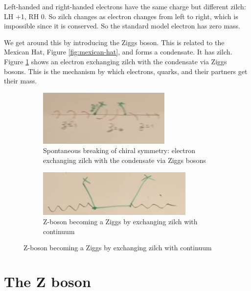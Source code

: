 \documentclass[]{article}
\begin{document}
\begin{figure}[H]
\begin{subfigure}[t]{0.3\textwidth}
	\end{subfigure}	
\end{figure} 

Left-handed and right-handed electrons have the same charge but different zilch: LH +1, RH 0. So zilch changes as electron changes from left to right, which is impossible since it is conserved. So the standard model electron has zero mass.

We get around this by introducing the Ziggs boson. This is related to the Mexican Hat, Figure \ref{fig:mexican-hat}, and forms a condensate. It has zilch. Figure \ref{fig:2-a3-zilch} shows an electron exchanging zilch with the condensate via Ziggs bosons. This is the mechanism by which electrons, quarks, and their partners get their mass.

\begin{figure}[H]
	\caption{Spontaneous breaking of chiral symmetry}
	\begin{subfigure}[t]{0.4\textwidth}
		\caption{Spontaneous breaking of chiral symmetry: electron exchanging zilch with the condensate via Ziggs bosons}\label{fig:2-a3-zilch}
		\includegraphics[width=\textwidth]{2-a3-zilch}
	\end{subfigure}
	\begin{subfigure}[t]{0.4\textwidth}
		\caption{Z-boson becoming a Ziggs by exchanging zilch with continuum}\label{fig:2-a3-zilch-Z}
		\includegraphics[width=\textwidth]{2-a3-zilch-Z}
	\end{subfigure}
\end{figure}

\section{The Z boson}
\end{document}
